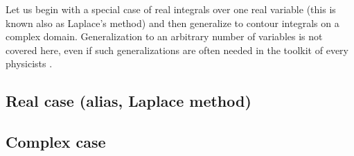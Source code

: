\documentclass[onecolumn,a4paper,11pt]{article}
\begin{document}
Let us begin with a special case of real integrals over one real variable (this
is known also as Laplace's method) and then generalize to contour integrals on
a  complex domain. Generalization to an arbitrary number of variables is not
covered here, even if such generalizations are often needed in the toolkit of
every physicists%
\autocite[Stepeest  descent method  generalizes also to
functional
integrations and path integrals, this is very important in dealing with
non-perturbative corrections in quantum mechanics and quantum field
theory. Refer to, \eg, ][]{Zinn-Justin:2002}.
\subsection{Real case (alias, Laplace method)}
\subsection{Complex case}

\printbibliography
\end{document}
